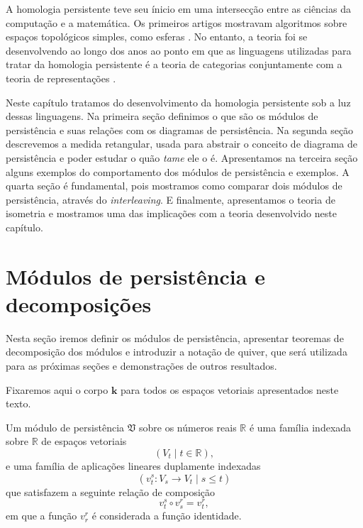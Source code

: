 A homologia persistente teve seu ínicio em uma intersecção entre as ciências da computação 
e a matemática. Os primeiros artigos mostravam algoritmos sobre espaços topológicos simples,
como esferas \cite{Edelsbrunner2000}. No entanto, a teoria foi se desenvolvendo 
ao longo dos anos ao ponto em que as linguagens utilizadas para tratar da homologia persistente 
é a teoria de categorias conjuntamente com a teoria de representações \cite{Chazal2016}.

Neste capítulo tratamos do desenvolvimento da homologia persistente sob a luz dessas linguagens. 
Na primeira seção definimos o que são os módulos de persistência e suas relações com os diagramas de 
persistência. Na segunda seção descrevemos a medida retangular, usada para abstrair o conceito 
de diagrama de persistência e poder estudar o quão \textit{tame} ele o é. Apresentamos na terceira seção
alguns exemplos do comportamento dos módulos de persistência e exemplos. A quarta seção é fundamental,
pois mostramos como comparar dois módulos de persistência, através do \textit{interleaving}. E finalmente,
apresentamos o teoria de isometria e mostramos uma das implicações com a teoria desenvolvido neste capítulo. 

\section{Módulos de persistência e decomposições}
Nesta seção iremos definir os módulos de persistência, apresentar teoremas de decomposição dos módulos 
e introduzir a notação de quiver, que será utilizada para as próximas seções e demonstrações de 
outros resultados. 

Fixaremos aqui o corpo $\mathbf{k}$ para todos os espaços vetoriais apresentados neste texto. 

\begin{defi}
    Um módulo de persistência $\mathfrak{V}$ sobre os números reais $\mathbb{R}$ é uma família indexada 
    sobre $\mathbb{R}$ de espaços vetoriais 
    \begin{equation*}
        (V_t \mid t \in \mathbb{R}), 
    \end{equation*} 
    e uma família de aplicações lineares duplamente indexadas
    \begin{equation*}
        (v_t^s \colon V_s \to V_t \mid s \leq t) 
    \end{equation*}
    que satisfazem a seguinte relação de composição
    \begin{equation*}
        v_t^s \circ v_s^r = v_t^r,
    \end{equation*} 
    em que a função $v^r_r$ é considerada a função identidade. 
\end{defi}

